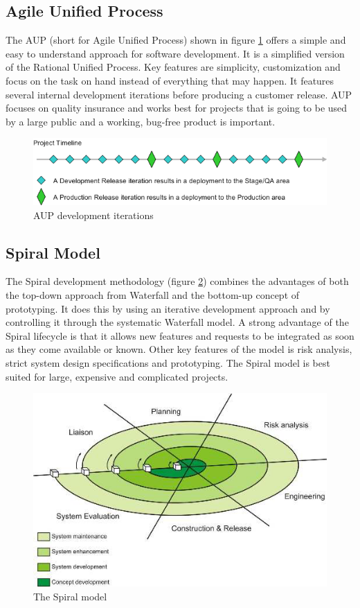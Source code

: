 \subsection{Agile Unified Process}
The AUP (short for Agile Unified Process) shown in figure \ref{fig:designmodel-aup} offers a simple and easy
to understand approach for software development. It is a simplified version of the Rational Unified Process.
Key features are simplicity, customization and focus on the task on hand instead of everything that may happen.
It features several internal development iterations before producing a customer release. AUP focuses on quality
insurance and works best for projects that is going to be used by a large public and a working, bug-free
product is important.
\begin{figure}[h!]
\centering \includegraphics[scale=0.65]{img/designmodel-aup}
\caption{AUP development iterations\cite{link:wiki-aup}}
\label{fig:designmodel-aup}
\end{figure}

\subsection{Spiral Model}
The Spiral development methodology (figure \ref{fig:designmodel-spiral}) combines the advantages of both the top-down approach 
from Waterfall and the bottom-up concept of prototyping. It does this by using an iterative development
approach and by controlling it through the systematic Waterfall model. A strong advantage of the Spiral lifecycle is that it
allows new features and requests to be integrated as soon as they come available or known. Other key 
features of the model is risk analysis, strict system design specifications and prototyping. The Spiral model
 is best suited for large, expensive and complicated projects.
\begin{figure}[h!]
\centering \includegraphics[scale=0.85]{img/designmodel-spiral}
\caption{The Spiral model~\cite{link:spiral}\cite{link:wiki-spiral}}
\label{fig:designmodel-spiral}
\end{figure}

